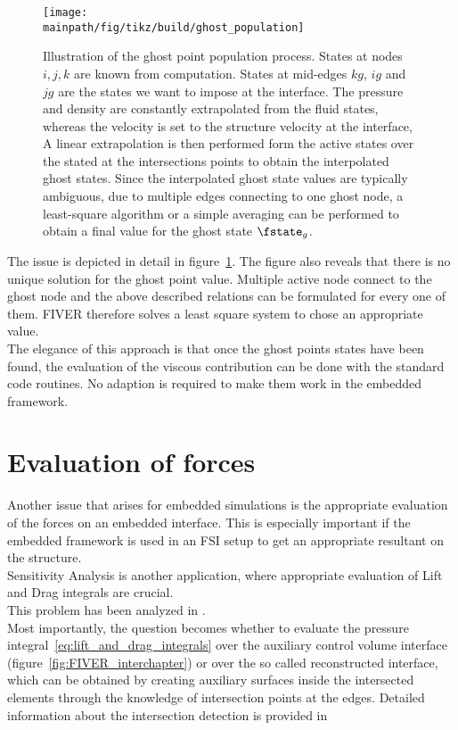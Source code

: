 \documentclass[../main.tex]{subfiles}
\begin{document}
\begin{figure}[h!]
	\begin{center}
        \texttt{[image: \\mainpath/fig/tikz/build/ghost\_population]}
        \caption[Ghost Point population]{Illustration of the ghost point population process. States at nodes $i,j,k$ are known from computation. States at mid-edges $kg$, $ig$ and $jg$ are the states we want to impose at the interface. The pressure and density are constantly extrapolated from the fluid states, whereas the velocity is set to the structure  velocity at the interface, A linear extrapolation is then performed form the active states over the stated at the intersections points to obtain the interpolated ghost states. Since the interpolated ghost state values are typically ambiguous, due to multiple edges connecting to one ghost node, a least-square algorithm or a simple averaging can be performed to obtain a final value for the ghost state $\fstate_g$.}
		\label{fig:ghost_population}
    \end{center}
\end{figure}


The issue is depicted in detail in figure~\ref{fig:ghost_population}.
The figure also reveals that there is no unique solution for the ghost point value. Multiple active node connect to the ghost node and the above described relations can be formulated for every one of them. \ac{FIVER} therefore solves a least square system to chose an appropriate value.\\
The elegance of this approach is that once the ghost points states have been found, the evaluation of the viscous contribution can be done with the standard code routines. No adaption is required to make them work in the embedded framework.


\section{Evaluation of forces}\label{sec:fiver_force_evaluation}
Another issue that arises for embedded simulations is the appropriate evaluation of the forces on an embedded interface. This is especially important if the embedded framework is used in an \ac{FSI} setup to get an appropriate resultant on the structure.\\
Sensitivity Analysis is another application, where appropriate evaluation of Lift and Drag integrals are crucial.\\
This problem has been analyzed in \cite{Wang2011}\cite{Wang2012}.\\
Most importantly, the question becomes whether to evaluate the pressure integral~\eqref{eq:lift_and_drag_integrals} over the auxiliary control volume interface (figure~\ref{fig:FIVER_interchapter}) or over the so called reconstructed interface, which can be obtained by creating auxiliary surfaces inside the intersected elements through the knowledge of intersection points at the edges. Detailed information about the intersection detection is provided in\cite{Wang2011a}
\end{document}

